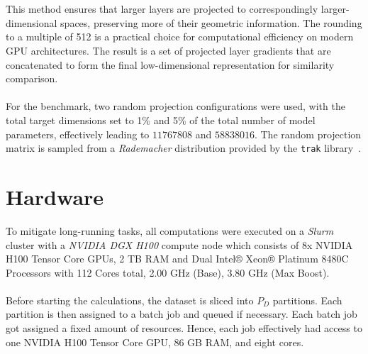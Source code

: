 \\\\
This method ensures that larger layers are projected to correspondingly larger-dimensional spaces, preserving more of their geometric information. The rounding to a multiple of 512 is a practical choice for computational efficiency on modern GPU architectures. The result is a set of projected layer gradients that are concatenated to form the final low-dimensional representation for similarity comparison.
\\\\
For the benchmark, two random projection configurations were used, with the total target
dimensions set to 1\% and 5\% of the total number of model parameters, effectively leading to $11767808$ and $58838016$. The random projection matrix is sampled from a \emph{Rademacher} distribution provided by the \texttt{trak} library~\cite{park2023trak}.

\section{Hardware}\label{sec:hardware}
To mitigate long-running tasks, all computations were executed on a \emph{Slurm} cluster with a \emph{NVIDIA DGX H100} compute node which consists of 8x NVIDIA H100 Tensor Core GPUs, 2 TB RAM and Dual Intel® Xeon® Platinum 8480C Processors with
112 Cores total, 2.00 GHz (Base), 3.80 GHz (Max Boost). 
\\\\
Before starting the calculations, the dataset is sliced into $P_D$ partitions. Each partition is then assigned to a batch job and queued if necessary. Each batch job got assigned a fixed amount of resources. Hence, each job effectively had access to one NVIDIA H100 Tensor Core GPU, 86 GB RAM, and eight cores.